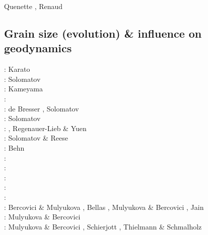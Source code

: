 \begin{scriptsize}
Quenette \etal \cite{quxm15}, Renaud \etal \cite{revf19}
\end{scriptsize}

\subsection{Grain size (evolution) \& influence on geodynamics}
\label{sec:topics:gsev}

\begin{scriptsize}
\nineteeneightyfour: Karato \cite{kara84}\\
\nineteenninetysix: Solomatov \cite{solo96}\\
\nineteenninetyseven: Kameyama \etal \cite{kayf97}\\
\nineteeneightynine: \cite{brcp99}\\
\twothousandone: de Bresser \etal \cite{dets01}, Solomatov \cite{solo01}\\
\twothousandtwo: Solomatov \etal \cite{soet02}\\
\twothousandthree: \cite{hapa03}, Regenauer-Lieb \& Yuen \cite{reyu03}\\
\twothousandeight: Solomatov \& Reese \cite{sore08}\\
\twothousandnine: Behn \etal \cite{behe09}\\
\twothousandeleven: \cite{rorb11}\\
\twothousandthirteen: \cite{beri13}\\
\twothousandfourteen: \cite{besr14}\\
\twothousandfifteen: \cite{thrk15}\cite{tukb15}\cite{pevp15}\cite{glfa15}\\
\twothousandseventeen: \cite{ceww17}\cite{daef17}\cite{mube17}\cite{scdu17}\\
\twothousandeighteen: Bercovici \& Mulyukova \cite{bemu18}, Bellas \etal \cite{bezb18},
                      Mulyukova \& Bercovici \cite{mube18}, Jain \etal \cite{jakk18}\\
\twothousandnineteen: Mulyukova \& Bercovici \cite{mube19}\\
\twothousandtwenty: Mulyukova \& Bercovici \cite{mube20}, Schierjott \etal \cite{scrt20,sctr20},
                    Thielmann \& Schmalholz \cite{thsc20}
\end{scriptsize}

